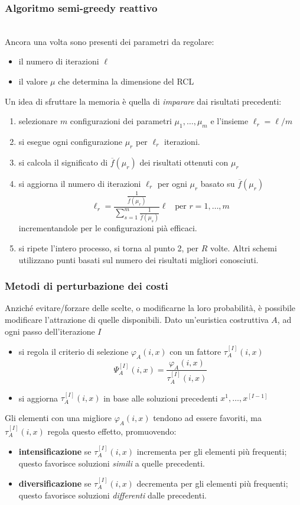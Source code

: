 \documentclass{article}
\begin{document}
\subsubsection{Algoritmo semi-greedy reattivo}\mbox{}\\
Ancora una volta sono presenti dei parametri da regolare:
\begin{itemize}
    \item il numero di iterazioni $\ell$
    \item il valore $\mu$ che determina la dimensione del RCL
\end{itemize}
Un idea di sfruttare la memoria è quella di \textit{imparare} dai risultati precedenti:
\begin{enumerate}
    \item selezionare $m$ configurazioni dei parametri $\mu_1,\dots,\mu_m$ e l'insieme $\ell_r=\ell/m$
    \item si esegue ogni configurazione $\mu_r$ per $\ell_r$ iterazioni.
    \item si calcola il significato di $\overline{f}(\mu_r)$ dei risultati ottenuti con $\mu_r$
    \item si aggiorna il numero di iterazioni $\ell_r$ per ogni $\mu_r$ basato su $\overline{f}(\mu_r)$
          $$\ell_r=\frac{\frac{1}{\overline{f}(\mu_r)}}{\sum_{s=1}^m \frac{1}{\overline{f}(\mu_s)}}\ell\;\;\;\text{per }r=1,\dots,m$$
          incrementandole per le configurazioni pià efficaci.
    \item si ripete l'intero processo, si torna al punto 2, per $R$ volte. Altri schemi utilizzano
          punti basati sul numero dei risultati migliori conosciuti.
\end{enumerate}

\subsubsection{Metodi di perturbazione dei costi}
Anziché evitare/forzare delle scelte, o modificarne la loro probabilità, è possibile modificare
l'attrazione di quelle disponibili. Dato un'euristica costruttiva $A$, ad ogni passo dell'iterazione
$I$
\begin{itemize}
    \item si regola il criterio di selezione $\varphi_A(i,x)$ con un fattore $\tau_A^{[I]}(i,x)$
          $$\Psi_A^{[I]}(i,x)=\frac{\varphi_A(i,x)}{\tau_A^{[I]}(i,x)}$$
    \item si aggiorna $\tau_A^{[I]}(i,x)$ in base alle soluzioni precedenti $x^{{1}},\dots,x^{[I-1]}$
\end{itemize}
Gli elementi con una migliore $\varphi_A(i,x)$ tendono ad essere favoriti, ma $\tau_A^{[I]}(i,x)$
regola questo effetto, promuovendo:
\begin{itemize}
    \item \textbf{intensificazione} se $\tau_A^{[I]}(i,x)$ incrementa per gli elementi più frequenti;
          questo favorisce soluzioni \textit{simili} a quelle precedenti.
    \item \textbf{diversificazione} se $\tau_A^{[I]}(i,x)$ decrementa per gli elementi più frequenti;
          questo favorisce soluzioni \textit{differenti} dalle precedenti.
\end{itemize}
\end{document}
